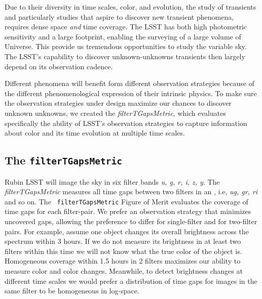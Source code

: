 Due to their diversity in time scales, color, and evolution, the study of transients and particularly studies that aspire to discover new transient phenomena, requires dense space \emph{and} time coverage.  
The LSST has both high photometric sensitivity and a large footprint, enabling the surveying of  a large volume of Universe. This provide us tremendous opportunities to study the variable sky. %
The LSST's capability to discover unknown-unknowns transients then largely depend on its observation cadence.

Different phenomena will benefit form different observation strategies because of the different phenomenological expression of their intrinsic physics. To make sure the observation strategies under design maximize  our chances to discover unknown unknowns, we created the {\it filterTGapsMetric}, which evaluates specifically  the ability of LSST's observation strategies to capture information about color and its time evolution at multiple time scales. 


\subsection{The \texttt{filterTGapsMetric}}\label{sec:fom:tgaps}

Rubin LSST will image the sky in six filter bands {\it u, g, r, i, z, y}. The {\it filterTGapsMetric} measures all time gaps between two filters in an \opsim, i.e, {\it ug, gr, ri} and so on. The \texttt{ filterTGapsMetric} Figure of Merit evaluates the coverage of time gaps for each filter-pair. We prefer an observation strategy that minimizes uncovered gaps, allowing the preference to differ for single-filter and for two-filter pairs. For example, assume one object changes its overall brightness across the spectrum within 3 hours. If we do not measure its brightness in at least two filters within this time we will not know what the true color of the object is. Homogeneous coverage within 1.5 hours in 2 filters maximizes our ability to measure color and color changes. Meanwhile, to detect brightness changes at different time scales we would prefer a distribution of time gaps for images in the same filter to be homogeneous in log-space.

